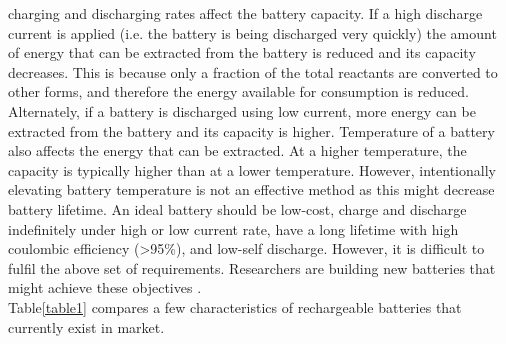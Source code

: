 charging and discharging rates affect the battery capacity. If a high discharge current is applied (i.e. the battery is being discharged very quickly) the amount of energy that can be extracted from the battery is reduced and its capacity decreases. This is because only a fraction of the total reactants are converted to other forms, and therefore the energy available for consumption is reduced. Alternately, if a battery is discharged using low current, more energy can be extracted from the battery and its capacity is higher. Temperature of a battery also affects the energy that can be extracted. At a higher temperature, the capacity is typically higher than at a lower temperature. However, intentionally elevating battery temperature is not an effective method as this might decrease battery lifetime\cite{leng_effect_2015, ma_temperature_2018}. 
An ideal battery should be low-cost, charge and discharge indefinitely under high or low current rate, have a long lifetime with high coulombic efficiency (>95\%), and low-self discharge. However, it is difficult to fulfil the above set of requirements. Researchers are building new batteries that might achieve these objectives \cite{slater_sodium-ion_2013,jian_carbon_2015,aurbach_prototype_2000,lin_ultrafast_2015-2}. \\

Table\ref{table1} compares a few characteristics of rechargeable batteries that currently exist in market. 

